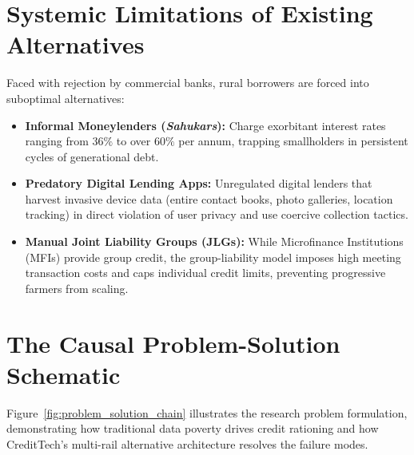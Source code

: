 \documentclass[11pt,a4paper,oneside]{report}
\begin{document}
\section{Systemic Limitations of Existing Alternatives}
Faced with rejection by commercial banks, rural borrowers are forced into suboptimal alternatives:
\begin{itemize}
  \item \textbf{Informal Moneylenders (\textit{Sahukars}):} Charge exorbitant interest rates ranging from $36\%$ to over $60\%$ per annum, trapping smallholders in persistent cycles of generational debt.
  \item \textbf{Predatory Digital Lending Apps:} Unregulated digital lenders that harvest invasive device data (entire contact books, photo galleries, location tracking) in direct violation of user privacy and use coercive collection tactics.
  \item \textbf{Manual Joint Liability Groups (JLGs):} While Microfinance Institutions (MFIs) provide group credit, the group-liability model imposes high meeting transaction costs and caps individual credit limits, preventing progressive farmers from scaling.
\end{itemize}

\section{The Causal Problem-Solution Schematic}
Figure~\ref{fig:problem_solution_chain} illustrates the research problem formulation, demonstrating how traditional data poverty drives credit rationing and how CreditTech's multi-rail alternative architecture resolves the failure modes.
\end{document}
